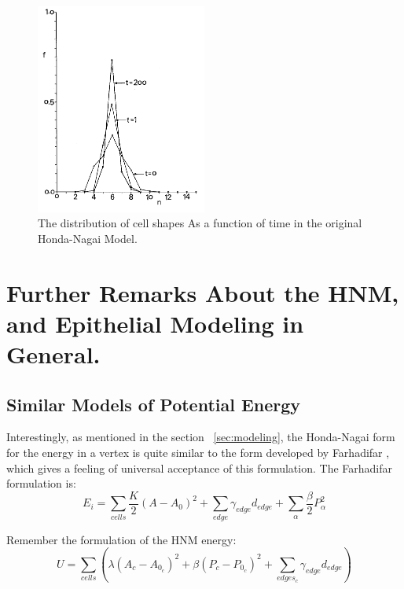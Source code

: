 \begin{figure}[ht]
\includegraphics[width=0.5\textwidth]{../diagrams/distibutionHonda.png}
\caption[Distribution of Cell Shapes]{The distribution of cell shapes As a function of time \cite{HondaNagai} in the original Honda-Nagai Model.}
\end{figure}

\section{Further Remarks About the HNM, and Epithelial Modeling in General.}
\subsection{Similar Models of Potential Energy}
Interestingly, as mentioned in the section ~\ref{sec:modeling}, the Honda-Nagai form for the energy in a vertex is quite similar to the form developed by Farhadifar \cite{Farhadifar}, which gives a feeling of universal acceptance of this formulation. The Farhadifar formulation is:
\begin{equation}
E_i = \sum\limits_{cells}\frac K2(A - A_0)^2 + \sum\limits_{edge}\gamma_{edge}d_{edge} + \sum\limits_{\alpha}\frac\beta2P_\alpha^2
\end{equation}

Remember the formulation of the HNM energy:
\begin{equation*}
U = \sum\limits_{cells}\left(\lambda(A_c - A_{0_c})^2 + \beta(P_c - P_{0_c})^2 + \sum_{edges_c}\gamma_{edge}d_{edge}\right)
\end{equation*}

